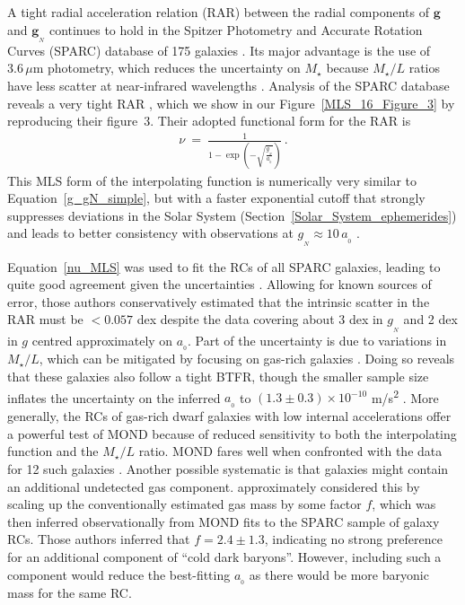 \documentclass[fleqn,usenatbib,useAMS]{mnras} %
\begin{document}
A tight radial acceleration relation (RAR) between the radial components of $\bm{g}$ and $\bm{g}_{_N}$ continues to hold in the Spitzer Photometry and Accurate Rotation Curves (SPARC) database of 175 galaxies \citep*{SPARC}. Its major advantage is the use of $3.6\,\mu$m photometry, which reduces the uncertainty on $M_{\star}$ because $M_{\star}/L$ ratios have less scatter at near-infrared wavelengths \citep{Bell_2001, Norris_2016}. Analysis of the SPARC database reveals a very tight RAR \citep{McGaugh_Lelli_2016}, which we show in our Figure~\ref{MLS_16_Figure_3} by reproducing their figure~3. Their adopted functional form for the RAR is
\begin{eqnarray}
	\nu ~=~ \frac{1}{1 - \exp \left( -\sqrt{\frac{g_{_N}}{a_{_0}}} \right)} \, .
	\label{nu_MLS}
\end{eqnarray}
This MLS form of the interpolating function is numerically very similar to Equation~\ref{g_gN_simple}, but with a faster exponential cutoff that strongly suppresses deviations in the Solar System (Section~\ref{Solar_System_ephemerides}) and leads to better consistency with observations at $g_{_N} \approx 10 \, a_{_0}$ \citep{Tian_2019}.

Equation~\ref{nu_MLS} was used to fit the RCs of all SPARC galaxies, leading to quite good agreement given the uncertainties \citep{Li_2018}. Allowing for known sources of error, those authors conservatively estimated that the intrinsic scatter in the RAR must be $< 0.057$ dex despite the data covering about 3 dex in $g_{_N}$ and 2 dex in $g$ centred approximately on $a_{_0}$. Part of the uncertainty is due to variations in $M_{\star}/L$, which can be mitigated by focusing on gas-rich galaxies \citep{Draine_2011}. Doing so reveals that these galaxies also follow a tight BTFR, though the smaller sample size inflates the uncertainty on the inferred $a_{_0}$ to $\left( 1.3 \pm 0.3 \right) \times 10^{-10}$ m/s\textsuperscript{2} \citep{McGaugh_2012}. More generally, the RCs of gas-rich dwarf galaxies with low internal accelerations offer a powerful test of MOND because of reduced sensitivity to both the interpolating function and the $M_{\star}/L$ ratio. MOND fares well when confronted with the data for 12 such galaxies \citep{Sanders_2019}. Another possible systematic is that galaxies might contain an additional undetected gas component. \citet*{Ghari_2019_gas} approximately considered this by scaling up the conventionally estimated gas mass by some factor $f$, which was then inferred observationally from MOND fits to the SPARC sample of galaxy RCs. Those authors inferred that $f = 2.4 \pm 1.3$, indicating no strong preference for an additional component of ``cold dark baryons''. However, including such a component would reduce the best-fitting $a_{_0}$ as there would be more baryonic mass for the same RC.
\end{document}
